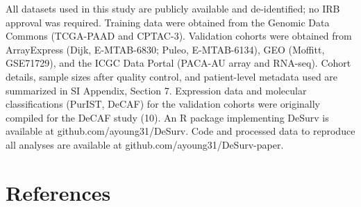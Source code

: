 \documentclass[9pt,twocolumn,twoside,]{pnas-new}
\begin{document}
All datasets used in this study are publicly available and
de-identified; no IRB approval was required. Training data were obtained
from the Genomic Data Commons (TCGA-PAAD and CPTAC-3). Validation
cohorts were obtained from ArrayExpress (Dijk, E-MTAB-6830; Puleo,
E-MTAB-6134), GEO (Moffitt, GSE71729), and the ICGC Data Portal (PACA-AU
array and RNA-seq). Cohort details, sample sizes after quality control,
and patient-level metadata used are summarized in SI Appendix, Section
7. Expression data and molecular classifications (PurIST, DeCAF) for the
validation cohorts were originally compiled for the DeCAF study (10). An
R package implementing DeSurv is available at
github.com/ayoung31/DeSurv. Code and processed data to reproduce all
analyses are available at github.com/ayoung31/DeSurv-paper.

\showmatmethods
\showacknow

\pnasbreak

\section*{References}\label{references}
\end{document}
